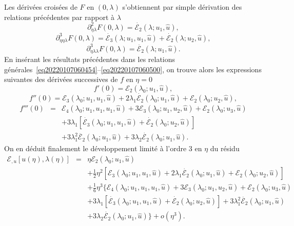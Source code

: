 \documentclass{article}
\begin{document}
Les dérivées croisées de $F$ en $(0, λ)$ s'obtiennent par
simple dérivation des relations précédentes par rapport à
$λ$
\begin{equation}
  \partial_{\eta  λ}^2 F (0, λ) = \dot{\mathcal{E}_2}
  (λ ; u_1, \hat{u}),
\end{equation}
\begin{equation}
  \partial_{\eta  \eta  λ}^3 F (0, λ) =
  \dot{\mathcal{E}_3} (λ ; u_1, u_1, \hat{u}) + \dot{\mathcal{E}_2}
  (λ ; u_2, \hat{u}),
\end{equation}
\begin{equation}
  \partial_{\eta  λ  λ}^3 F (0, λ) =
  \ddot{\mathcal{E}_2} (λ ; u_1, \hat{u}) .
\end{equation}
En insérant les résultats précédentes dans les relations
générales~\eqref{eq20220107060454}--\eqref{eq20220107060500}, on
trouve alors les expressions suivantes des dérivées successives de $f$
en $\eta = 0$
\begin{equation}
  f' (0) =\mathcal{E}_2 (λ_0 ; u_1, \hat{u}),
\end{equation}
\begin{equation}
  f'' (0) =\mathcal{E}_3 (λ_0 ; u_1, u_1, \hat{u}) + 2 λ_1
  \dot{\mathcal{E}_2} (λ_0 ; u_1, \hat{u}) +\mathcal{E}_2 (λ_0 ;
  u_2, \hat{u}),
\end{equation}
\begin{eqnarray}
  f''' (0) & = & \mathcal{E}_4 (λ_0 ; u_1, u_1, u_1, \hat{u}) +
  3\mathcal{E}_3 (λ_0 ; u_1, u_2, \hat{u}) +\mathcal{E}_2 (λ_0 ;
  u_3, \hat{u}) \nonumber\\
  &  &  + 3 λ_1  [\dot{\mathcal{E}_3} (λ_0 ; u_1, u_1,
  \hat{u}) + \dot{\mathcal{E}_2} (λ_0 ; u_2, \hat{u})] \nonumber\\
  &  &  + 3 λ_1^2  \ddot{\mathcal{E}_2} (λ_0 ; u_1,
  \hat{u}) + 3 λ_2  \dot{\mathcal{E}_2} (λ_0 ; u_1, \hat{u}) .
\end{eqnarray}
On en déduit finalement le développement limité à l'ordre 3 en
$\eta$ du résidu
\begin{eqnarray}
  \mathcal{E}_{, u} [u (\eta), λ (\eta)] & = & \eta \mathcal{E}_2
  (λ_0 ; u_1, \hat{u}) \nonumber\\
  &  &  + \tfrac{1}{2} \eta^2  [\mathcal{E}_3 (λ_0 ; u_1, u_1,
  \hat{u}) + 2 λ_1  \dot{\mathcal{E}_2} (λ_0 ; u_1, \hat{u})
  +\mathcal{E}_2 (λ_0 ; u_2, \hat{u})] \nonumber\\
  &  &  + \tfrac{1}{6} \eta^3  \{ \mathcal{E}_4 (λ_0 ; u_1,
  u_1, u_1, \hat{u}) + 3\mathcal{E}_3 (λ_0 ; u_1, u_2, \hat{u})
   +\mathcal{E}_2 (λ_0 ; u_3, \hat{u}) \nonumber\\
  &  &  + 3 λ_1  [\dot{\mathcal{E}_3} (λ_0 ; u_1, u_1,
  \hat{u}) + \dot{\mathcal{E}_2} (λ_0 ; u_2, \hat{u})] + 3 λ_1^2
  \ddot{\mathcal{E}_2} (λ_0 ; u_1, \hat{u}) \nonumber\\
  &  &   + 3 λ_2  \dot{\mathcal{E}_2} (λ_0 ;
  u_1, \hat{u}) \} + o (\eta^3) .  \label{eq20220107080901}
\end{eqnarray}
\end{document}
